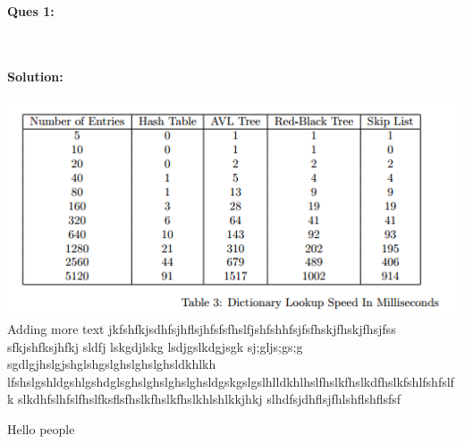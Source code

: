 \documentclass[a4paper,12pt]{article}
\author{Varun Singh}
\begin{document}
\thispagestyle{firststyle}
\textbf{Ques 1: }
\begin{minipage}[t]{16cm}
\lipsum[1]
\end{minipage}\\ \\
\textbf{Solution:}
\begin{minipage}[t]{16cm}
\lipsum[2]
\includegraphics{1.PNG}\\
\lipsum[1] Adding more text jkfshfkjsdhfsjhflsjhfsfsfhslfjshfshhfsjfsfhskjfhskjfhsjfss
sfkjshfksjhfkj sldfj lskgdjlskg lsdjgslkdgjsgk sj;gljs;gs;g
sgdlgjhslgjshglshgslghslghslghsldkhlkh lfshslgshldgshlgshdglsghslghslghslghsldgskgslgslhlldkhlhslfhslkfhslkdfhslkfshlfshfslfk
slkdhfslhfslfhslfksflsfhslkfhslkfhslkhlshlkkjhkj
slhdfsjdhflsjfhlshflshflsfsf
\end{minipage}

\newpage
\begin{flushright}
\begin{minipage}[tx]{16.1cm} %
Hello people \lipsum[5]
\end{minipage}\\
\end{flushright}
\end{document}
